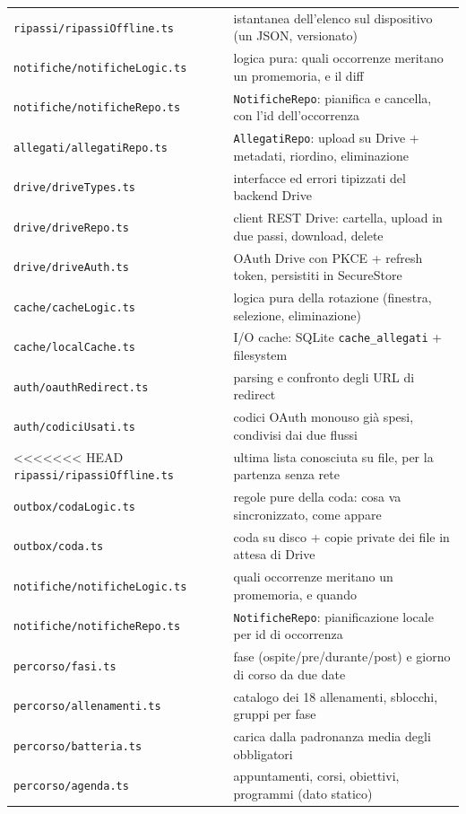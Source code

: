 \documentclass[11pt,a4paper]{report}
\begin{document}
\begin{center}
\begin{tabular}{@{}p{5.9cm}p{8.9cm}@{}}
\texttt{ripassi/ripassiOffline.ts} & istantanea dell'elenco sul dispositivo (un JSON, versionato) \\
\texttt{notifiche/notificheLogic.ts} & logica pura: quali occorrenze meritano un promemoria, e il diff \\
\texttt{notifiche/notificheRepo.ts} & \texttt{NotificheRepo}: pianifica e cancella, con l'id dell'occorrenza \\
\texttt{allegati/allegatiRepo.ts} & \texttt{AllegatiRepo}: upload su Drive + metadati, riordino, eliminazione \\
\texttt{drive/driveTypes.ts} & interfacce ed errori tipizzati del backend Drive \\
\texttt{drive/driveRepo.ts} & client REST Drive: cartella, upload in due passi, download, delete \\
\texttt{drive/driveAuth.ts} & OAuth Drive con PKCE + refresh token, persistiti in SecureStore \\
\texttt{cache/cacheLogic.ts} & logica pura della rotazione (finestra, selezione, eliminazione) \\
\texttt{cache/localCache.ts} & I/O cache: SQLite \texttt{cache\_allegati} + filesystem \\
\texttt{auth/oauthRedirect.ts} & parsing e confronto degli URL di redirect \\
\texttt{auth/codiciUsati.ts} & codici OAuth monouso gi\`a spesi, condivisi dai due flussi \\
<<<<<<< HEAD
\texttt{ripassi/ripassiOffline.ts} & ultima lista conosciuta su file, per la partenza senza rete \\
\texttt{outbox/codaLogic.ts} & regole pure della coda: cosa va sincronizzato, come appare \\
\texttt{outbox/coda.ts} & coda su disco + copie private dei file in attesa di Drive \\
\texttt{notifiche/notificheLogic.ts} & quali occorrenze meritano un promemoria, e quando \\
\texttt{notifiche/notificheRepo.ts} & \texttt{NotificheRepo}: pianificazione locale per id di occorrenza \\
\texttt{percorso/fasi.ts} & fase (ospite/pre/durante/post) e giorno di corso da due date \\
\texttt{percorso/allenamenti.ts} & catalogo dei 18 allenamenti, sblocchi, gruppi per fase \\
\texttt{percorso/batteria.ts} & carica dalla padronanza media degli obbligatori \\
\texttt{percorso/agenda.ts} & appuntamenti, corsi, obiettivi, programmi (dato statico) \\

\end{tabular}
\end{center}
\end{document}
